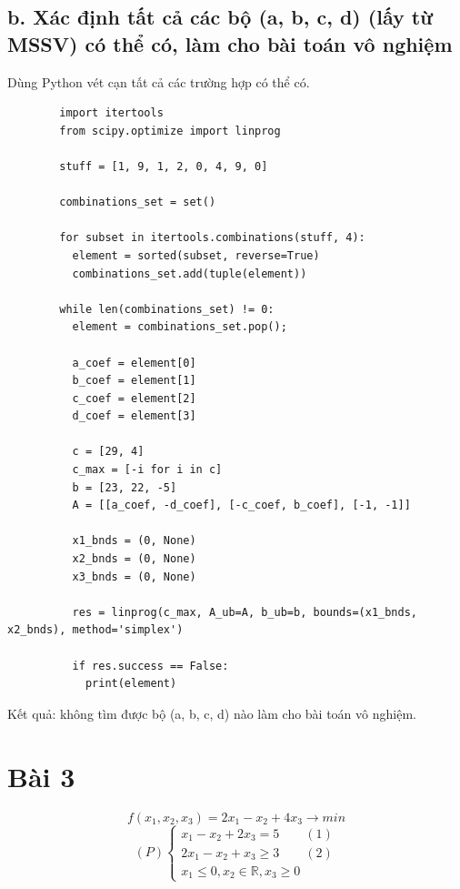 \documentclass[12pt,a4paper]{article}
\begin{document}
		\subsection*{b. Xác định tất cả các bộ (a, b, c, d) (lấy từ MSSV) có thể có, làm cho bài toán vô nghiệm}
		Dùng Python vét cạn tất cả các trường hợp có thể có.
		\begin{lstlisting}
		import itertools
		from scipy.optimize import linprog
		
		stuff = [1, 9, 1, 2, 0, 4, 9, 0]
		
		combinations_set = set()
		
		for subset in itertools.combinations(stuff, 4):
		  element = sorted(subset, reverse=True)
		  combinations_set.add(tuple(element))
		
		while len(combinations_set) != 0:
		  element = combinations_set.pop();
		
		  a_coef = element[0]
		  b_coef = element[1]
		  c_coef = element[2]
		  d_coef = element[3]
		
		  c = [29, 4]
		  c_max = [-i for i in c]
		  b = [23, 22, -5]
		  A = [[a_coef, -d_coef], [-c_coef, b_coef], [-1, -1]]
		
		  x1_bnds = (0, None)
		  x2_bnds = (0, None)
		  x3_bnds = (0, None)
		
		  res = linprog(c_max, A_ub=A, b_ub=b, bounds=(x1_bnds, x2_bnds), method='simplex')
		
		  if res.success == False:
		    print(element)
		\end{lstlisting}
		Kết quả: không tìm được bộ (a, b, c, d) nào làm cho bài toán vô nghiệm.
	\section*{Bài 3}
		\[f(x_1, x_2, x_3) = 2x_1 - x_2 + 4x_3 \rightarrow min\]
		\[(P) \begin{cases}
			x_1 - x_2 + 2x_3 = 5 \qquad (1)\\
			2x_1 - x_2 + x_3 \geq 3 \qquad (2)\\
			x_1 \leq 0, x_2 \in \mathbb{R}, x_3 \geq 0
		\end{cases}\]
\end{document}
